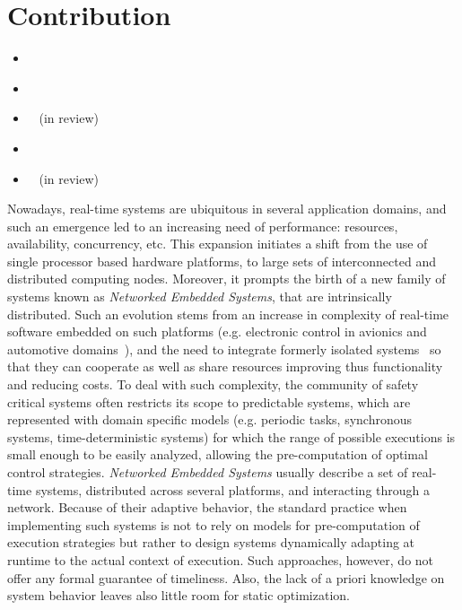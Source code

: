 \section{Contribution}

\begin{itemize}
  \item[]\cite{fm16}~
  \item[]\cite{apsec17}~
  \item[]\cite{lites}~ (in review)
  \item[]\cite{drift}~ 
  \item[]\cite{sbip}~ (in review)
\end{itemize}

Nowadays, real-time systems are ubiquitous in several application domains, 
and such an emergence led to an increasing need of performance: resources, 
availability, concurrency, etc. This expansion initiates a shift from the
use of single processor based hardware platforms, to large sets 
of interconnected and distributed computing nodes. Moreover, it prompts the birth 
of a new family of systems known as \emph{Networked Embedded Systems}, 
that are intrinsically distributed.
Such an evolution stems from an increase in complexity of real-time software 
embedded on such platforms (e.g. electronic control in avionics 
and automotive domains~\cite{charette09}), and the need to integrate 
formerly isolated systems~\cite{kopetz04} so that 
they can cooperate as well as share resources improving thus functionality 
and reducing costs.
To deal with such complexity, the community of safety critical systems 
often restricts its scope to predictable systems, which are represented 
with domain specific models (e.g. periodic tasks, synchronous systems, 
time-deterministic systems) for which the range of possible executions 
is small enough to be easily analyzed, allowing the pre-computation 
of optimal control strategies.
\emph{Networked Embedded Systems} usually describe a set of real-time systems, 
distributed across several platforms, and interacting through a network. 
Because of their adaptive behavior, the standard practice when implementing 
such systems is not to rely on models for pre-computation of execution strategies but rather 
to design systems dynamically adapting at runtime to the actual context of execution.
Such approaches, however, do not offer any formal guarantee of timeliness. Also, 
the lack of a priori knowledge on system behavior leaves also little room for 
static optimization.

